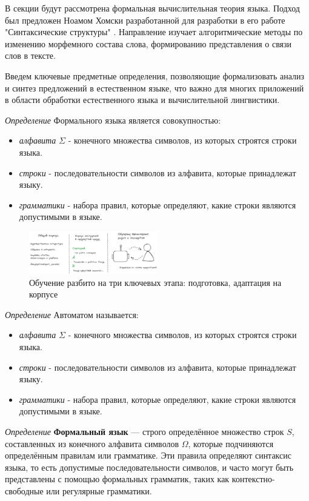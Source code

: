 В секции будут рассмотрена формальная вычислительная теория языка.
Подход был предложен Ноамом Хомски разработанной для разработки
в его работе "Синтаксические структуры" \cite{chomsky2002syntactic}. Направление изучает алгоритмические 
методы по изменению морфемного состава слова, формированию представления о связи слов в тексте.

Введем ключевые предметные определения, позволяющие формализовать анализ и 
синтез предложений в естественном языке, что важно для многих приложений 
в области обработки естественного языка и вычислительной лингвистики.
 
\textit{Определение} Формального языка является совокупностью:
\begin{itemize}
    \item \textit{алфавита} $\Sigma$ - конечного множества символов, из которых строятся строки языка.
    \item \textit{строки} - последовательности символов из алфавита, которые принадлежат языку.
    \item \textit{грамматики} - набора правил, которые определяют, какие строки являются допустимыми в языке.
\end{itemize}
\begin{figure}[h]
    \centering
    \includegraphics[width=0.5\textwidth]{assets/work/arch/learning.excalidraw.png}
    \caption{Обучение разбито на три ключевых этапа: подготовка, адаптация на корпусе}
    \label{train}
\end{figure}

\textit{Определение} Автоматом называется:
\begin{itemize}
    \item \textit{алфавита} $\Sigma$ - конечного множества символов, из которых строятся строки языка.
    \item \textit{строки} - последовательности символов из алфавита, которые принадлежат языку.
    \item \textit{грамматики} - набора правил, которые определяют, какие строки являются допустимыми в языке.
\end{itemize}


\textit{Определение} \textbf{Формальный язык} — строго определённое множество строк $S$, составленных из конечного алфавита символов $\Omega$,
 которые подчиняются определённым правилам или грамматике.
Эти правила определяют синтаксис языка, то есть допустимые последовательности символов,
 и часто могут быть представлены с помощью формальных грамматик, таких как контекстно-свободные или регулярные грамматики.

